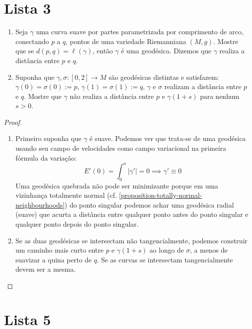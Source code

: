 \section{Lista 3}
\label{section-lista-3}

\begin{exercise}
\label{exercise-curvas-minimizantes}
\begin{enumerate}
\item Seja $\gamma$ uma curva suave por partes parametrizada por comprimento de
 arco, conectando $p$ a $q$, pontos de uma variedade Riemanniana $(M,g)$.
 Mostre que se $d(p,q)=\ell(\gamma)$, então $\gamma$ é uma geodésica.
 Dizemos que $\gamma$ realiza a distância entre $p$ e $q$.
\item Suponha que $\gamma,\sigma:[0,2]\to M$ são geodésicas distintas
 e satisfazem: $\gamma(0)=\sigma(0):=p$, $\gamma(1)=\sigma(1):=q$, 
$\gamma$ e $\sigma$ realizam a distância entre $p$ e $q$.
 Mostre que $\gamma$ não realiza a distância entre $p$ e $\gamma(1+s)$ 
para nenhum $s>0$.
\end{enumerate}
\end{exercise}

\begin{proof}
\begin{enumerate}
\item Primeiro suponha que $\gamma$ é suave. Podemos ver que trata-se de uma 
geodésica usando seu campo de velocidades como campo variacional na primeira
fórmula da variação:
$$
E'(0)=\int_0^a |\gamma'|=0 \implies \gamma'\equiv 0
$$
Uma geodésica quebrada não pode ser minimizante porque em uma vizinhança 
totalmente normal (cf. \ref{proposition-totally-normal-neighbourhoods}) 
do ponto singular podemos achar uma geodésica radial (suave)
 que acurta a distância entre qualquer ponto antes do ponto singular
 e qualquer ponto depois do ponto singular.
\item Se as duas geodésicas se intersectam não tangencialmente, podemos 
construir um caminho mais curto entre $p$ e $\gamma(1+s)$ ao longo de $\sigma$,
a menos de suavizar a quina perto de $q$. Se as curvas se intersectam
 tangencialmente devem ser a mesma.
\end{enumerate}
\end{proof}

\section{Lista 5}
\label{section-lista-5}

